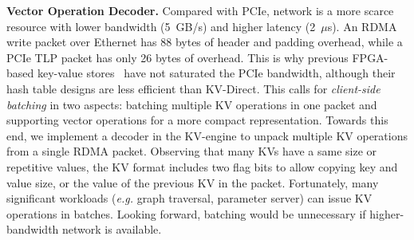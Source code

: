 \textbf{Vector Operation Decoder.}
Compared with PCIe, network is a more scarce resource with lower bandwidth (5~GB/s) and higher latency (2~$\mu$s).
An RDMA write packet over Ethernet has 88 bytes of header and padding overhead, while a PCIe TLP packet has only 26 bytes of overhead.
This is why previous FPGA-based key-value stores~\cite{blott13hotcloud,blott2015scaling} have not saturated the PCIe bandwidth, although their hash table designs are less efficient than KV-Direct.
This calls for \textit{client-side batching} in two aspects: batching multiple KV operations in one packet and supporting vector operations for a more compact representation. Towards this end, we implement a decoder in the KV-engine to unpack multiple KV operations from a single RDMA packet.
Observing that many KVs have a same size or repetitive values, the KV format includes two flag bits to allow copying key and value size, or the value of the previous KV in the packet.
Fortunately, many significant workloads (\textit{e.g.} graph traversal, parameter server) can issue KV operations in batches.
Looking forward, batching would be unnecessary if higher-bandwidth network is available.
